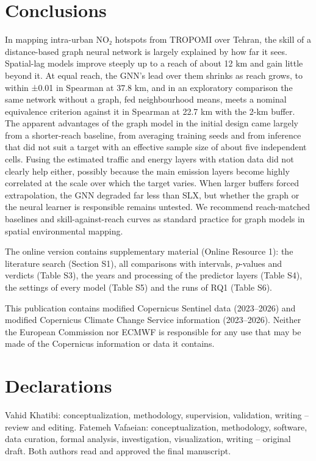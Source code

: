 \documentclass[pdflatex,sn-basic]{sn-jnl}
\begin{document}
\section{Conclusions}\label{sec:conclusions}

In mapping intra-urban NO₂ hotspots from TROPOMI over Tehran, the skill of a distance-based graph neural network is largely explained by how far it sees. Spatial-lag models improve steeply up to a reach of about 12 km and gain little beyond it. At equal reach, the GNN's lead over them shrinks as reach grows, to within ±0.01 in Spearman at 37.8 km, and in an exploratory comparison the same network without a graph, fed neighbourhood means, meets a nominal equivalence criterion against it in Spearman at 22.7 km with the 2-km buffer. The apparent advantages of the graph model in the initial design came largely from a shorter-reach baseline, from averaging training seeds and from inference that did not suit a target with an effective sample size of about five independent cells. Fusing the estimated traffic and energy layers with station data did not clearly help either, possibly because the main emission layers become highly correlated at the scale over which the target varies. When larger buffers forced extrapolation, the GNN degraded far less than SLX, but whether the graph or the neural learner is responsible remains untested. We recommend reach-matched baselines and skill-against-reach curves as standard practice for graph models in spatial environmental mapping.

\backmatter

The online version contains supplementary material (Online Resource 1): the literature search (Section S1), all comparisons with intervals, $p$-values and verdicts (Table S3), the years and processing of the predictor layers (Table S4), the settings of every model (Table S5) and the runs of RQ1 (Table S6).

This publication contains modified Copernicus Sentinel data (2023--2026) and modified Copernicus Climate Change Service information (2023--2026). Neither the European Commission nor ECMWF is responsible for any use that may be made of the Copernicus information or data it contains.

\section*{Declarations}

Vahid Khatibi: conceptualization, methodology, supervision, validation, writing -- review and editing. Fatemeh Vafaeian: conceptualization, methodology, software, data curation, formal analysis, investigation, visualization, writing -- original draft. Both authors read and approved the final manuscript.
\end{document}
